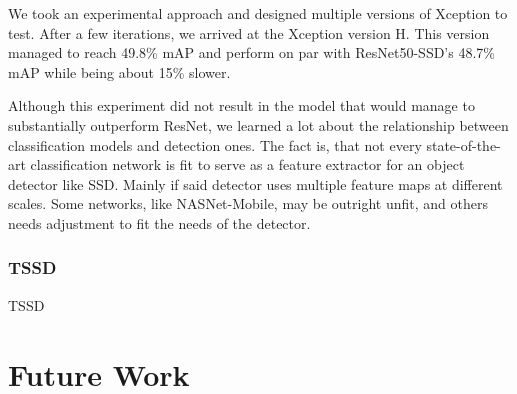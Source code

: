 We took an experimental approach and designed multiple versions of Xception to test. After a few iterations, we arrived at the Xception version H. This version managed to reach 49.8\% mAP and perform on par with ResNet50-SSD's 48.7\% mAP while being about 15\% slower. 

Although this experiment did not result in the model that would manage to substantially outperform ResNet, we learned a lot about the relationship between classification models and detection ones. The fact is, that not every state-of-the-art classification network is fit to serve as a feature extractor for an object detector like SSD. Mainly if said detector uses multiple feature maps at different scales. Some networks, like NASNet-Mobile, may be outright unfit, and others needs adjustment to fit the needs of the detector.

\subsubsection*{TSSD}
TSSD



\section*{Future Work}




